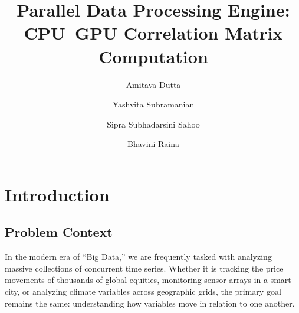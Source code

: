 


\title{Parallel Data Processing Engine: CPU–GPU Correlation Matrix Computation}

\author{
    \small Amitava Dutta \and
    \small Yashvita Subramanian \and
    \small Sipra Subhadarsini Sahoo \and
    \small Bhavini Raina
    }

\hypersetup{citecolor=black}




\maketitle




\section{Introduction}

\subsection{Problem Context}

In the modern era of ``Big Data,'' we are frequently tasked with analyzing massive collections of concurrent time series. Whether it is tracking the price movements of thousands of global equities, monitoring sensor arrays in a smart city, or analyzing climate variables across geographic grids, the primary goal remains the same: understanding how variables move in relation to one another.

